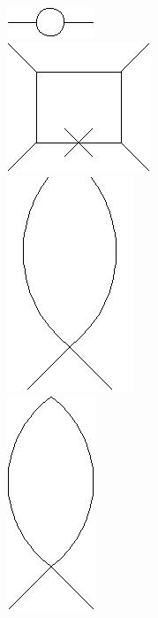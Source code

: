 \documentclass{scrartcl}
\begin{document}
\includegraphics[scale=0.3]{images/6.jpg}\\
\includegraphics[scale=0.3]{images/7.jpg}\\
\includegraphics[scale=0.3]{images/openfish.jpg}\\
\includegraphics[scale=0.3]{images/closedfish.jpg}\\

\newpage

 

\end{document}
